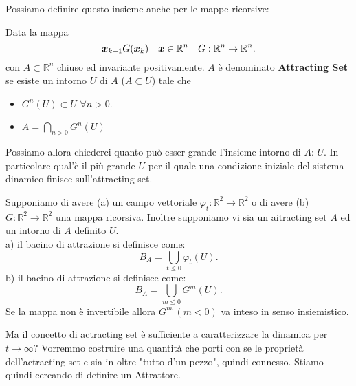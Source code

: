 \noindent
Possiamo definire questo insieme anche per le mappe ricorsive:
\begin{defn}
    Data la mappa 
    \[
	\boldsymbol{x}_{k+1}G(\boldsymbol{x}_k) \quad\boldsymbol{x}\in \mathbb{R}^n \quad  G:\mathbb{R}^n\to \mathbb{R}^n
    .\] 
    con $A\subset\mathbb{R}^n$ chiuso ed invariante positivamente. $A$ è denominato \textbf{Attracting Set} se esiste un intorno $U$ di $A$ ($A \subset U$) tale che 
    \begin{itemize}
	\item $G^n(U) \subset U$ $\forall n > 0$.
	\item $A = \bigcap\limits_{n>0}G^n(U)$ 
    \end{itemize}
\end{defn}
\noindent
Possiamo allora chiederci quanto può esser grande l'insieme intorno di $A$: $U$. In particolare qual'è il più grande $U$ per il quale una condizione iniziale del sistema dinamico finisce sull'attracting set.
\begin{defn}
    Supponiamo di avere (a) un campo vettoriale $\varphi_t:\mathbb{R}^2\to \mathbb{R}^2$ o di avere (b) $G:\mathbb{R}^2\to \mathbb{R}^2$ una mappa ricorsiva. Inoltre supponiamo vi sia un aitracting set $A$ ed un intorno di $A$ definito $U$.\\
    a) il bacino di attrazione si definisce come:
    \[
	B_A = \bigcup\limits_{t\le 0}\varphi_t(U) 
    .\] 
    b) il bacino di attrazione si definisce come:
    \[
	B_A = \bigcup\limits_{m\le 0}G^m(U) 
    .\] 
    Se la mappa non è invertibile allora $G^m \ (m<0)$ va inteso in senso insiemistico.
\end{defn}
\noindent
Ma il concetto di actracting set è sufficiente a caratterizzare la dinamica per $t\to \infty$? Vorremmo costruire una quantità che porti con se le proprietà dell'actracting set e sia in oltre "tutto d'un pezzo", quindi connesso. Stiamo quindi cercando di definire un Attrattore.
